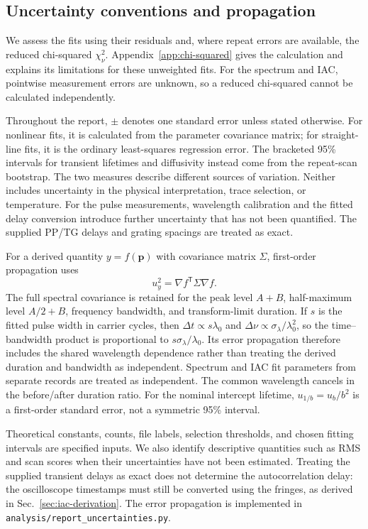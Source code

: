 \documentclass[11pt,a4paper]{article}
\begin{document}
\subsection{Uncertainty conventions and propagation}\label{sec:uncertainty}
We assess the fits using their residuals and, where repeat errors are available, the reduced chi-squared $\chi^2_\nu$. Appendix~\ref{app:chi-squared} gives the calculation and explains its limitations for these unweighted fits. For the spectrum and IAC, pointwise measurement errors are unknown, so a reduced chi-squared cannot be calculated independently.

Throughout the report, $\pm$ denotes one standard error unless stated otherwise. For nonlinear fits, it is calculated from the parameter covariance matrix; for straight-line fits, it is the ordinary least-squares regression error. The bracketed 95\% intervals for transient lifetimes and diffusivity instead come from the repeat-scan bootstrap. The two measures describe different sources of variation. Neither includes uncertainty in the physical interpretation, trace selection, or temperature. For the pulse measurements, wavelength calibration and the fitted delay conversion introduce further uncertainty that has not been quantified. The supplied PP/TG delays and grating spacings are treated as exact.

For a derived quantity $y=f(\mathbf p)$ with covariance matrix $\Sigma$, first-order propagation uses
\begin{equation}
u_y^2=\nabla f^{\mathsf T}\Sigma\nabla f.
\end{equation}
The full spectral covariance is retained for the peak level $A+B$, half-maximum level $A/2+B$, frequency bandwidth, and transform-limit duration. If $s$ is the fitted pulse width in carrier cycles, then $\Delta t\propto s\lambda_0$ and $\Delta\nu\propto\sigma_\lambda/\lambda_0^2$, so the time--bandwidth product is proportional to $s\sigma_\lambda/\lambda_0$. Its error propagation therefore includes the shared wavelength dependence rather than treating the derived duration and bandwidth as independent. Spectrum and IAC fit parameters from separate records are treated as independent. The common wavelength cancels in the before/after duration ratio. For the nominal intercept lifetime, $u_{1/b}=u_b/b^2$ is a first-order standard error, not a symmetric 95\% interval.

Theoretical constants, counts, file labels, selection thresholds, and chosen fitting intervals are specified inputs. We also identify descriptive quantities such as RMS and scan scores when their uncertainties have not been estimated. Treating the supplied transient delays as exact does not determine the autocorrelation delay: the oscilloscope timestamps must still be converted using the fringes, as derived in Sec.~\ref{sec:iac-derivation}. The error propagation is implemented in \texttt{analysis/report\_uncertainties.py}.
\end{document}
